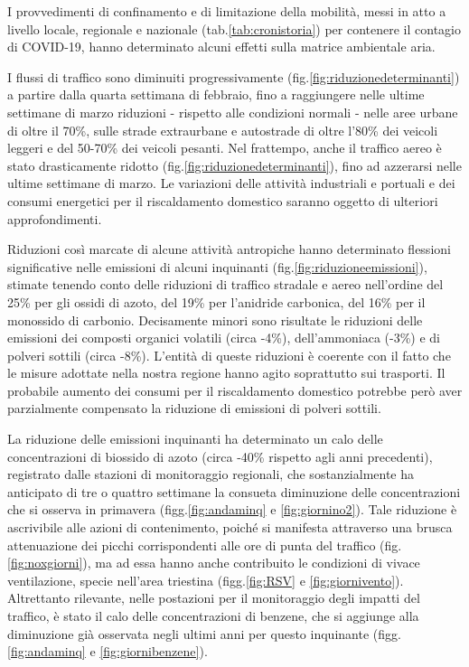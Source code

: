 I provvedimenti di confinamento e di limitazione della mobilità, messi in atto a livello locale, regionale e nazionale (tab.\ref{tab:cronistoria}) per contenere il contagio di COVID-19, hanno determinato alcuni effetti sulla matrice ambientale aria.

I flussi di traffico sono diminuiti progressivamente (fig.\ref{fig:riduzionedeterminanti}) a partire dalla quarta settimana di febbraio, fino a raggiungere nelle ultime settimane di marzo riduzioni - rispetto alle condizioni normali - nelle aree urbane di oltre il 70\%, sulle strade extraurbane e autostrade di oltre l'80\% dei veicoli leggeri e del 50-70\% dei veicoli pesanti.
Nel frattempo, anche il traffico aereo è stato drasticamente ridotto  (fig.\ref{fig:riduzionedeterminanti}), fino ad azzerarsi nelle ultime settimane di marzo. Le variazioni delle attività industriali e portuali e dei consumi energetici per il riscaldamento domestico saranno oggetto di ulteriori approfondimenti.

Riduzioni così marcate di alcune attività antropiche hanno determinato flessioni significative nelle emissioni di alcuni inquinanti  (fig.\ref{fig:riduzioneemissioni}), stimate tenendo conto delle riduzioni di traffico stradale e aereo nell'ordine del 25\% per gli ossidi di azoto, del 19\% per l'anidride carbonica, del 16\% per il monossido di carbonio. Decisamente minori sono risultate le riduzioni delle emissioni dei composti organici volatili (circa -4\%), dell'ammoniaca (-3\%) e di polveri sottili (circa -8\%). L'entità di queste riduzioni è coerente con il fatto che le misure adottate nella nostra regione hanno agito soprattutto sui trasporti. Il probabile aumento dei consumi per il riscaldamento domestico potrebbe però aver parzialmente compensato la riduzione di emissioni di polveri sottili.

La riduzione delle emissioni inquinanti ha determinato un calo delle concentrazioni di biossido di azoto (circa -40\% rispetto agli anni precedenti), registrato dalle stazioni di monitoraggio regionali, che sostanzialmente ha anticipato di tre o quattro settimane la consueta diminuzione delle concentrazioni che si osserva in primavera  (figg.\ref{fig:andaminq} e \ref{fig:giornino2}). Tale riduzione è ascrivibile alle azioni di contenimento, poiché si manifesta attraverso una brusca attenuazione dei picchi corrispondenti alle ore di punta del traffico  (fig.\ref{fig:noxgiorni}), ma ad essa hanno anche contribuito le condizioni di vivace ventilazione, specie nell'area triestina  (figg.\ref{fig:RSV} e \ref{fig:giornivento}). Altrettanto rilevante, nelle postazioni per il monitoraggio degli impatti del traffico, è stato il calo delle concentrazioni di benzene, che si aggiunge alla diminuzione già osservata negli ultimi anni per questo inquinante  (figg.\ref{fig:andaminq} e \ref{fig:giornibenzene}).

